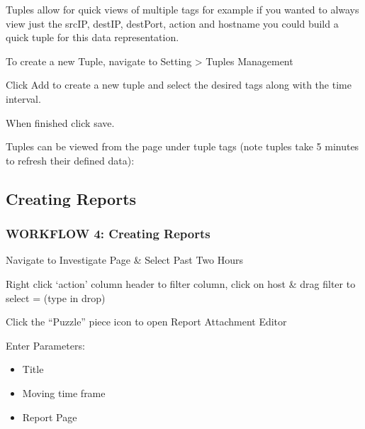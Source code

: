 \documentclass[letterpaper,10pt,english]{sphinxmanual}
\begin{document}
Tuples allow for quick views of multiple tags \textendash{} for example if you
wanted to always view just the srcIP, destIP, destPort, action and
hostname you could build a quick tuple for this data representation.

To create a new Tuple, navigate to Setting \textgreater{} Tuples Management

Click Add to create a new tuple and select the desired tags along with
the time interval.


When finished click save.

Tuples can be viewed from the  page under tuple tags
(note tuples take 5 minutes to refresh their defined data):



\subsection{Creating Reports}
\label{\detokenize{class1/module6/lab5::doc}}\label{\detokenize{class1/module6/lab5:creating-reports}}

\subsubsection{WORKFLOW 4: Creating Reports}
\label{\detokenize{class1/module6/lab5:workflow-4-creating-reports}}
Navigate to Investigate Page \& Select Past Two Hours



Right click ‘action’ column header to filter column, click on host \&
drag filter to select = (type in drop)



Click the “Puzzle” piece icon to open Report Attachment Editor


Enter Parameters:
\begin{itemize}
\item {} 
Title

\item {} 
Moving time frame

\item {} 
Report Page

\end{itemize}
\end{document}
